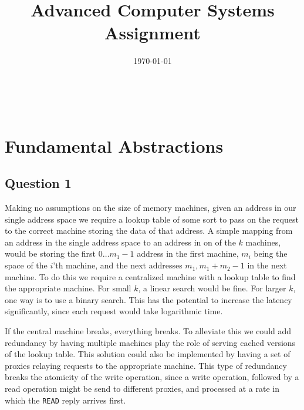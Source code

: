 \documentclass[10pt,a4paper]{article}
\title
{
    Advanced Computer Systems \\
    {\Large Assignment \assignmentnumber}
}
\author
{
    \authform{Hans J. T. Stephensen}{xkv467}
    \and
    \authform{Casper B. Hansen}{fvx507}
}
\date{\today}
\newcommand{\theabstract}
{
    \lipsum[1-1]
}
\newcommand{\colbreak}{{\ }\vfill\columnbreak}
\begin{document}
\clearpage
\maketitle
\thispagestyle{empty}

\setlength{\columnsep}{0pt}
\begin{multicols}{2}
    \abstract{\theabstract}
    \colbreak
    \tableofcontents
\end{multicols}
\setlength{\columnsep}{10pt}
\clearpage



\section{Fundamental Abstractions}

\subsection{Question 1}

Making no assumptions on the size of memory machines, given an address in our single address space we require a lookup table of some sort to pass on the request to the correct machine storing the data of that address. A simple mapping from an address in the single address space to an address in on of the $k$ machines, would be storing the first $0 \dots m_1-1$ address in the first machine, $m_i$ being the space of the $i$'th machine, and the next addresses $m_1, m_1+m_2-1$ in the next machine. To do this we require a centralized machine with a lookup table to find the appropriate machine. For small $k$, a linear search would be fine. For larger $k$, one way is to use a binary search. This has the potential to increase the latency significantly, since each request would take logarithmic time.

If the central machine breaks, everything breaks. To alleviate this we could add redundancy by having multiple machines play the role of serving cached versions of the lookup table. This solution could also be implemented by having a set of proxies relaying requests to the appropriate machine. This type of redundancy breaks the atomicity of the write operation, since a write operation, followed by a read operation might be send to different proxies, and processed at a rate in which the {\tt READ} reply arrives first.
\end{document}
